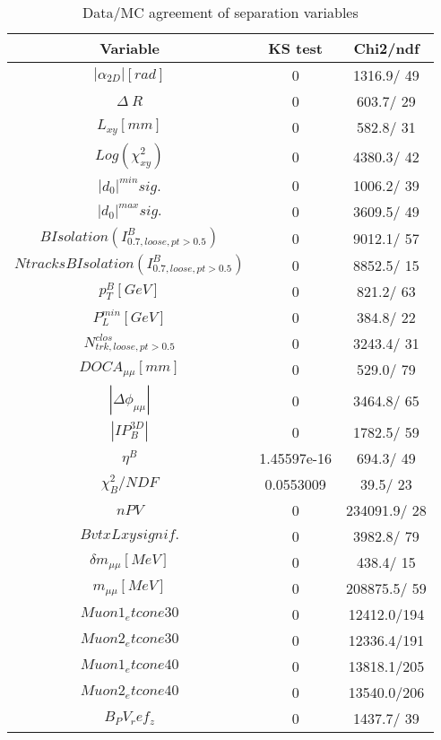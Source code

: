\documentclass{article}
\begin{document}
\begin{table}[htbp]
\caption{\label{tab:sepVars}Data/MC agreement of separation variables}
\begin{center}
\begin{tabular}{c|c|c}
Variable & KS test & Chi2/ndf \\
\hline
$|\alpha_{2D}| [rad]$ & 0 & 1316.9/ 49\\
\hline
$\Delta~R$ & 0 & 603.7/ 29\\
\hline
$L_{xy} [mm]$ & 0 & 582.8/ 31\\
\hline
$Log(\chi^{2}_{xy})$ & 0 & 4380.3/ 42\\
\hline
$|d_{0}|^{min} sig.$ & 0 & 1006.2/ 39\\
\hline
$|d_{0}|^{max} sig.$ & 0 & 3609.5/ 49\\
\hline
$B Isolation (I^{B}_{0.7, loose, pt>0.5})$ & 0 & 9012.1/ 57\\
\hline
$Ntracks B Isolation (I^{B}_{0.7, loose, pt>0.5})$ & 0 & 8852.5/ 15\\
\hline
$p_{T}^{B} [GeV]$ & 0 & 821.2/ 63\\
\hline
$P^{min}_{L} [GeV]$ & 0 & 384.8/ 22\\
\hline
$N^{clos}_{trk, loose, pt>0.5}$ & 0 & 3243.4/ 31\\
\hline
$DOCA_{\mu\mu} [mm]$ & 0 & 529.0/ 79\\
\hline
$|\Delta\phi_{\mu\mu}|$ & 0 & 3464.8/ 65\\
\hline
$|IP_{B}^{3D}|$ & 0 & 1782.5/ 59\\
\hline
$\eta^{B}$ & 1.45597e-16 & 694.3/ 49\\
\hline
$\chi^{2}_{B}/NDF$ & 0.0553009 &  39.5/ 23\\
\hline
$nPV$ & 0 & 234091.9/ 28\\
\hline
$BvtxLxy signif.$ & 0 & 3982.8/ 79\\
\hline
$\delta m_{\mu\mu} [MeV]$ & 0 & 438.4/ 15\\
\hline
$m_{\mu\mu} [MeV]$ & 0 & 208875.5/ 59\\
\hline
$Muon1_etcone30$ & 0 & 12412.0/194\\
\hline
$Muon2_etcone30$ & 0 & 12336.4/191\\
\hline
$Muon1_etcone40$ & 0 & 13818.1/205\\
\hline
$Muon2_etcone40$ & 0 & 13540.0/206\\
\hline
$B_PV_ref_z$ & 0 & 1437.7/ 39\\
\hline
\end{tabular}
\end{center}
\end{table}
\end{document}
